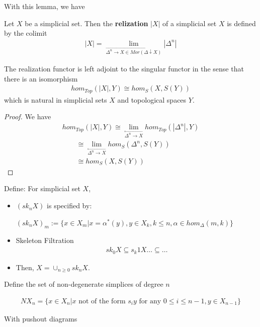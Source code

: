 \documentclass[Total.tex]{subfiles}
\begin{document}
			With this lemma, we have
			\begin{Def}
				Let $X$ be a simplicial set. Then the \textbf{relization} $|X|$ of a simplicial set $X$ is defined by the colimit
				\begin{gather*}
					|X|=\lim_{\stackrel{\rightarrow}{\Delta^n\rightarrow X\in Mor(\Delta\downarrow X)}} |\Delta^n|
				\end{gather*}
			\end{Def}
			
			\begin{proposition}
				The realization functor is left adjoint to the singular functor in the sense that there is an isomorphism
				\begin{gather*}
					hom_{Top}(|X|,Y)\cong hom_S(X,S(Y))
				\end{gather*}
				which is natural in simplicial sets $X$ and topological spaces $Y$.
			\end{proposition}
			\begin{proof}
				We have
				\begin{gather*}
					hom_{Top}(|X|,Y)\cong \lim_{\stackrel{\leftarrow}{\Delta^n\rightarrow X}} hom_{Top} (|\Delta^n|,Y)\\
					\qquad \cong \lim_{\stackrel{\leftarrow}{\Delta^n\rightarrow X}} hom_S(\Delta^n,S(Y))\\
					\qquad \cong hom_S(X,S(Y))
				\end{gather*}
			\end{proof}
			\begin{Def}
				Define: For simplicial set $X$,
				\begin{itemize}
					\item $(sk_nX)$ is specified by:
					
					$(sk_n X)_m:=\{x\in X_m|x=\alpha^*(y),y\in X_k,k\leq n,\alpha\in hom_\Delta(m,k)\}$
					\item Skeleton Filtration
					\begin{gather*}
						sk_0X\subseteq s_k1X\dots\subseteq\dots
					\end{gather*}
					\item Then, $X=\cup_{n\geq 0} sk_n X$.
				\end{itemize}
			\end{Def}
			Define the set of non-degenerate simplices of degree $n$
			\begin{Def}
				\begin{gather*}
					NX_n=\{x\in X_n|x\mbox{ not of the form }s_i y\mbox{ for any }0\leq i\leq n-1,y\in X_{n-1}\}
				\end{gather*}
			
			\end{Def}
			With pushout diagrams
			\begin{center}
			\end{center}
\end{document}
